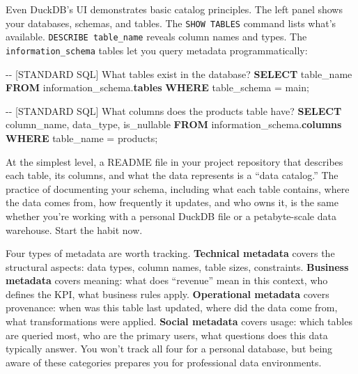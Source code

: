 \documentclass[
  letterpaper,
  DIV=11,
  numbers=noendperiod]{scrreprt}
\newenvironment{Shaded}{\begin{snugshade}}{\end{snugshade}}
\newcommand{\CommentTok}[1]{\textcolor[rgb]{0.37,0.37,0.37}{#1}}
\newcommand{\KeywordTok}[1]{\textcolor[rgb]{0.00,0.23,0.31}{\textbf{#1}}}
\newcommand{\NormalTok}[1]{\textcolor[rgb]{0.00,0.23,0.31}{#1}}
\newcommand{\OperatorTok}[1]{\textcolor[rgb]{0.37,0.37,0.37}{#1}}
\newcommand{\StringTok}[1]{\textcolor[rgb]{0.13,0.47,0.30}{#1}}
\begin{document}
Even DuckDB's UI demonstrates basic catalog principles. The left panel
shows your databases, schemas, and tables. The \texttt{SHOW\ TABLES}
command lists what's available. \texttt{DESCRIBE\ table\_name} reveals
column names and types. The \texttt{information\_schema} tables let you
query metadata programmatically:

\begin{codelisting}

\caption{\texttt{duckdb}}

\begin{Shaded}
\begin{Highlighting}[]
\CommentTok{{-}{-} [STANDARD SQL] What tables exist in the database?}
\KeywordTok{SELECT}\NormalTok{ table\_name}
\KeywordTok{FROM}\NormalTok{ information\_schema.}\KeywordTok{tables}
\KeywordTok{WHERE}\NormalTok{ table\_schema }\OperatorTok{=} \StringTok{\textquotesingle{}main\textquotesingle{}}\NormalTok{;}

\CommentTok{{-}{-} [STANDARD SQL] What columns does the products table have?}
\KeywordTok{SELECT}\NormalTok{ column\_name, data\_type, is\_nullable}
\KeywordTok{FROM}\NormalTok{ information\_schema.}\KeywordTok{columns}
\KeywordTok{WHERE}\NormalTok{ table\_name }\OperatorTok{=} \StringTok{\textquotesingle{}products\textquotesingle{}}\NormalTok{;}
\end{Highlighting}
\end{Shaded}

\end{codelisting}

At the simplest level, a README file in your project repository that
describes each table, its columns, and what the data represents is a
``data catalog.'' The practice of documenting your schema, including
what each table contains, where the data comes from, how frequently it
updates, and who owns it, is the same whether you're working with a
personal DuckDB file or a petabyte-scale data warehouse. Start the habit
now.

Four types of metadata are worth tracking. \textbf{Technical metadata}
covers the structural aspects: data types, column names, table sizes,
constraints. \textbf{Business metadata} covers meaning: what does
``revenue'' mean in this context, who defines the KPI, what business
rules apply. \textbf{Operational metadata} covers provenance: when was
this table last updated, where did the data come from, what
transformations were applied. \textbf{Social metadata} covers usage:
which tables are queried most, who are the primary users, what questions
does this data typically answer. You won't track all four for a personal
database, but being aware of these categories prepares you for
professional data environments.
\end{document}
